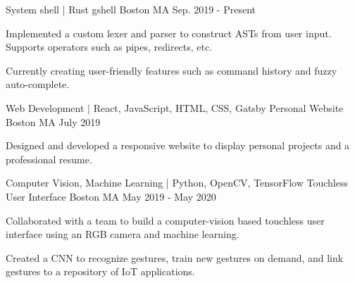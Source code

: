 

\begin{cventries}

    \cventry
    {System shell | Rust} %
    {gshell} %
    {Boston MA} %
    {Sep. 2019 - Present} %
    {
      \begin{cvitems} %
        \item {Implemented a custom lexer and parser to construct ASTs from user input. Supports operators such as pipes, redirects, etc.}
        \item {Currently creating user-friendly features such as command history and fuzzy auto-complete.}
      \end{cvitems}
    }

  \cventry
    {Web Development | React, JavaScript, HTML, CSS, Gatsby} %
    {Personal Website} %
    {Boston MA} %
    {July 2019} %
    {
      \begin{cvitems} %
        \item {Designed and developed a responsive website to display personal projects and a professional resume.}
      \end{cvitems}
    }
    
    \cventry
    {Computer Vision, Machine Learning | Python, OpenCV, TensorFlow} %
    {Touchless User Interface} %
    {Boston MA} %
    {May 2019 - May 2020} %
    {
      \begin{cvitems} %
        \item {Collaborated with a team to build a computer-vision based touchless user interface using an RGB camera and machine learning.}
        \item {Created a CNN to recognize gestures, train new gestures on demand, and link gestures to a repository of IoT applications.}
      \end{cvitems}
    }



\end{cventries}
